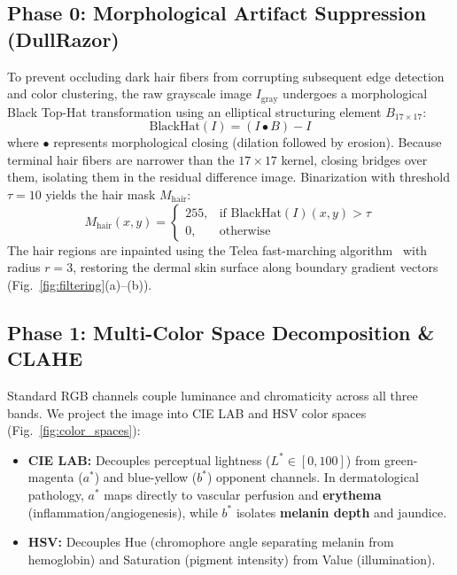 \documentclass[conference]{IEEEtran}
\begin{document}
\subsection{Phase 0: Morphological Artifact Suppression (DullRazor)}
To prevent occluding dark hair fibers from corrupting subsequent edge detection and color clustering, the raw grayscale image $I_{\text{gray}}$ undergoes a morphological Black Top-Hat transformation using an elliptical structuring element $B_{17 \times 17}$:
\begin{equation}
    \text{BlackHat}(I) = (I \bullet B) - I
\end{equation}
where $\bullet$ represents morphological closing (dilation followed by erosion). Because terminal hair fibers are narrower than the $17 \times 17$ kernel, closing bridges over them, isolating them in the residual difference image. Binarization with threshold $\tau = 10$ yields the hair mask $M_{\text{hair}}$:
\begin{equation}
    M_{\text{hair}}(x, y) = \begin{cases} 255, & \text{if } \text{BlackHat}(I)(x, y) > \tau \\ 0, & \text{otherwise} \end{cases}
\end{equation}
The hair regions are inpainted using the Telea fast-marching algorithm~\cite{telea2004image} with radius $r=3$, restoring the dermal skin surface along boundary gradient vectors (Fig.~\ref{fig:filtering}(a)--(b)).

\subsection{Phase 1: Multi-Color Space Decomposition \& CLAHE}
Standard RGB channels couple luminance and chromaticity across all three bands. We project the image into CIE LAB and HSV color spaces (Fig.~\ref{fig:color_spaces}):
\begin{itemize}
    \item \textbf{CIE LAB:} Decouples perceptual lightness ($L^* \in [0, 100]$) from green-magenta ($a^*$) and blue-yellow ($b^*$) opponent channels. In dermatological pathology, $a^*$ maps directly to vascular perfusion and \textbf{erythema} (inflammation/angiogenesis), while $b^*$ isolates \textbf{melanin depth} and jaundice.
    \item \textbf{HSV:} Decouples Hue (chromophore angle separating melanin from hemoglobin) and Saturation (pigment intensity) from Value (illumination).
\end{itemize}
\end{document}
